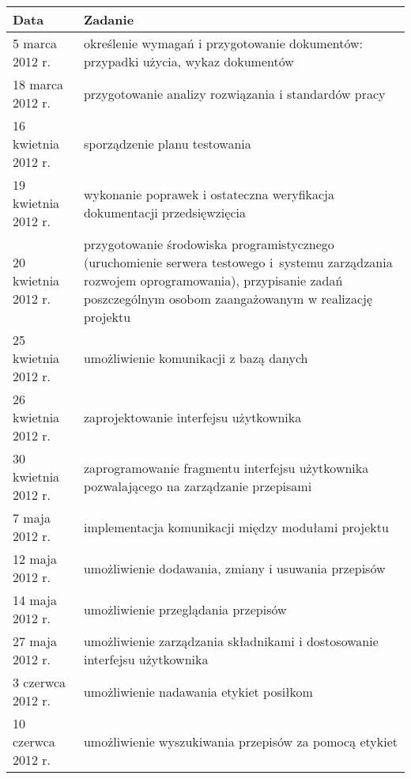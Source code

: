 \documentclass[12pt,leqno, twoside]{mwart}
\begin{document}
\begin{table}
	\centering
		\begin{tabular}{|p{4cm}|p{11cm}|}
		\hline
		\bf{Data}            & \bf{Zadanie} \\ \hline
		5 marca 2012 r. & określenie wymagań i przygotowanie dokumentów: przypadki użycia, wykaz dokumentów \\ \hline
		
		18 marca 2012 r. & przygotowanie analizy rozwiązania i standardów pracy\\ \hline
		
		16 kwietnia 2012 r. & sporządzenie planu testowania \\ \hline
		
		19 kwietnia 2012 r. & wykonanie poprawek i ostateczna weryfikacja dokumentacji przedsięwzięcia \\ \hline
		
		20 kwietnia 2012 r. & przygotowanie środowiska programistycznego (uruchomienie serwera testowego i~systemu zarządzania rozwojem oprogramowania), przypisanie zadań poszczególnym osobom zaangażowanym w realizację projektu \\ \hline
		25 kwietnia 2012 r. & umożliwienie komunikacji z bazą danych \\ \hline
		
		26 kwietnia 2012 r. & zaprojektowanie interfejsu użytkownika  \\ \hline
		
		30 kwietnia 2012 r. & zaprogramowanie fragmentu interfejsu użytkownika pozwalającego na zarządzanie przepisami \\ \hline
		
		7 maja 2012 r. & implementacja komunikacji między modułami projektu \\ \hline
		
		12 maja 2012 r. & umożliwienie dodawania, zmiany i usuwania przepisów \\ \hline
		
		14 maja 2012 r. & umożliwienie przeglądania przepisów \\ \hline
		
		27 maja 2012 r. & umożliwienie zarządzania składnikami i dostosowanie interfejsu użytkownika\\ \hline
		
		3 czerwca 2012 r. & umożliwienie nadawania etykiet posiłkom \\ \hline
		
		10 czerwca 2012 r. & umożliwienie wyszukiwania przepisów za pomocą etykiet \\ \hline
		

\end{tabular}
\end{table}
\end{document}
